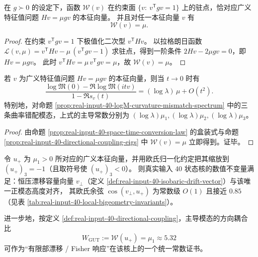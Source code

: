 \begin{proposition}\label{prop:real-input-40-directional-coupling-eigs}
在 \(g\succ 0\) 的设定下，函数 \(\mathcal{W}(v)\) 在约束面 \(\{v:\ v^{\mathsf T}gv=1\}\) 上的驻点，恰对应广义特征值问题 \(Hv=\mu gv\) 的本征向量。
并且对任一本征向量 \(v\) 有
\[
\mathcal{W}(v)=\mu.
\]
\end{proposition}
\begin{proof}
在约束 \(v^{\mathsf T}gv=1\) 下极值化二次型 \(v^{\mathsf T}Hv\)。
以拉格朗日函数
\(
\mathcal{L}(v,\mu)=v^{\mathsf T}Hv-\mu\,(v^{\mathsf T}gv-1)
\)
求驻点，得到一阶条件 \(2Hv-2\mu gv=0\)，即 \(Hv=\mu gv\)。
此时 \(v^{\mathsf T}Hv=\mu\,v^{\mathsf T}gv=\mu\)，故 \(\mathcal{W}(v)=\mu\)。
\end{proof}

\begin{corollary}\label{cor:real-input-40-space-time-conversion-eigmodes}
若 \(v\) 为广义特征值问题 \(Hv=\mu gv\) 的本征向量，则当 \(t\to 0\) 时有
\[
\frac{\log\mathfrak{M}(0)-\Re\log\mathfrak{M}(itv)}{1-\Re s_v(t)}
=(\log\lambda)\,\mu+O(t^2).
\]
特别地，对命题 \ref{prop:real-input-40-logM-curvature-mismatch-spectrum} 中的三条曲率错配模态，上式的主导常数分别为 \((\log\lambda)\mu_1,(\log\lambda)\mu_2,(\log\lambda)\mu_3\)。
\end{corollary}
\begin{proof}
由命题 \ref{prop:real-input-40-space-time-conversion-law} 的盒装式与命题 \ref{prop:real-input-40-directional-coupling-eigs} 中 \(\mathcal{W}(v)=\mu\) 立即得到。证毕。
\end{proof}

\begin{proposition}\label{prop:real-input-40-unified-generator-alignment}
令 \(u_+\) 为 \(\mu_1>0\) 所对应的广义本征向量，并用欧氏归一化约定把其缩放到 \((u_+)_3=-1\)（且取符号使 \((u_+)_3<0\)）。
则真实输入 40 状态核的数值不变量满足：恒压漂移容量向量 \(v_\perp\)（定义 \ref{def:real-input-40-isobaric-drift-vector}）与该唯一正模态高度对齐，
其欧氏余弦 \(\cos(v_\perp,u_+)\) 为常数级 \(O(1)\) 且接近 \(0.85\)（见表 \ref{tab:real-input-40-local-bigeometry-invariants}）。
\par
进一步地，按定义 \ref{def:real-input-40-directional-coupling}，主导模态的方向耦合比
\[
W_{\mathrm{GUT}}:=\mathcal{W}(u_+)=\mu_1\approx 5.32
\]
可作为“有限部漂移 / Fisher 响应”在该核上的一个统一常数证书。
\end{proposition}

